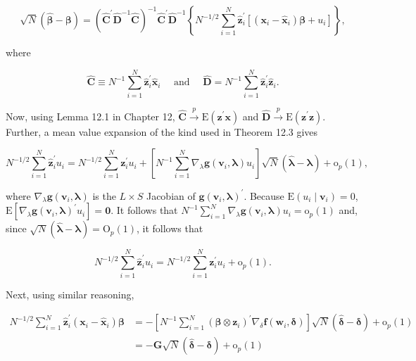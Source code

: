 \documentclass[10pt]{article}
\begin{document}
$$
\sqrt{N}(\hat{\boldsymbol{\beta}}-\boldsymbol{\beta})=\left(\hat{\mathbf{C}}^{\prime} \hat{\mathbf{D}}^{-1} \hat{\mathbf{C}}\right)^{-1} \hat{\mathbf{C}}^{\prime} \hat{\mathbf{D}}^{-1}\left\{N^{-1 / 2} \sum_{i=1}^{N} \hat{\mathbf{z}}_{i}^{\prime}\left[\left(\mathbf{x}_{i}-\hat{\mathbf{x}}_{i}\right) \boldsymbol{\beta}+u_{i}\right]\right\},
$$

where

$$
\hat{\mathbf{C}} \equiv N^{-1} \sum_{i=1}^{N} \hat{\mathbf{z}}_{i}^{\prime} \hat{\mathbf{x}}_{i} \quad \text { and } \quad \hat{\mathbf{D}}=N^{-1} \sum_{i=1}^{N} \hat{\mathbf{z}}_{i}^{\prime} \hat{\mathbf{z}}_{i} .
$$

Now, using Lemma 12.1 in Chapter 12, $\hat{\mathbf{C}} \xrightarrow{p} \mathrm{E}\left(\mathbf{z}^{\prime} \mathbf{x}\right)$ and $\hat{\mathbf{D}} \xrightarrow{p} \mathrm{E}\left(\mathbf{z}^{\prime} \mathbf{z}\right)$. Further, a mean value expansion of the kind used in Theorem 12.3 gives

$$
N^{-1 / 2} \sum_{i=1}^{N} \hat{\mathbf{z}}_{i}^{\prime} u_{i}=N^{-1 / 2} \sum_{i=1}^{N} \mathbf{z}_{i}^{\prime} u_{i}+\left[N^{-1} \sum_{i=1}^{N} \nabla_{\lambda} \mathbf{g}\left(\mathbf{v}_{i}, \boldsymbol{\lambda}\right) u_{i}\right] \sqrt{N}(\hat{\boldsymbol{\lambda}}-\boldsymbol{\lambda})+\mathrm{o}_{p}(1),
$$

where $\nabla_{\lambda} \mathbf{g}\left(\mathbf{v}_{i}, \boldsymbol{\lambda}\right)$ is the $L \times S$ Jacobian of $\mathbf{g}\left(\mathbf{v}_{i}, \boldsymbol{\lambda}\right)^{\prime}$. Because $\mathrm{E}\left(u_{i} \mid \mathbf{v}_{i}\right)=0$, $\mathrm{E}\left[\nabla_{\lambda} \mathbf{g}\left(\mathbf{v}_{i}, \boldsymbol{\lambda}\right)^{\prime} u_{i}\right]=\mathbf{0}$. It follows that $N^{-1} \sum_{i=1}^{N} \nabla_{\lambda} \mathbf{g}\left(\mathbf{v}_{i}, \boldsymbol{\lambda}\right) u_{i}=\mathrm{o}_{p}(1)$ and, since $\sqrt{N}(\hat{\boldsymbol{\lambda}}-\boldsymbol{\lambda})=\mathrm{O}_{p}(1)$, it follows that

$$
N^{-1 / 2} \sum_{i=1}^{N} \hat{\mathbf{z}}_{i}^{\prime} u_{i}=N^{-1 / 2} \sum_{i=1}^{N} \mathbf{z}_{i}^{\prime} u_{i}+\mathrm{o}_{p}(1) .
$$

Next, using similar reasoning,

$$
\begin{aligned}
N^{-1 / 2} \sum_{i=1}^{N} \hat{\mathbf{z}}_{i}^{\prime}\left(\mathbf{x}_{i}-\hat{\mathbf{x}}_{i}\right) \boldsymbol{\beta} & =-\left[N^{-1} \sum_{i=1}^{N}\left(\boldsymbol{\beta} \otimes \mathbf{z}_{i}\right)^{\prime} \nabla_{\delta} \mathbf{f}\left(\mathbf{w}_{i}, \boldsymbol{\delta}\right)\right] \sqrt{N}(\hat{\boldsymbol{\delta}}-\boldsymbol{\delta})+\mathrm{o}_{p}(1) \\
& =-\mathbf{G} \sqrt{N}(\hat{\boldsymbol{\delta}}-\boldsymbol{\delta})+\mathrm{o}_{p}(1)
\end{aligned}
$$
\end{document}
